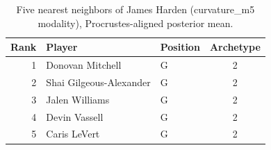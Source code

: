 \begin{table}[htbp]
  \centering\small
  \begin{tabular}{rllc}
    \toprule
    Rank & Player & Position & Archetype \\
    \midrule
    1 & Donovan Mitchell & G & 2 \\
    2 & Shai Gilgeous-Alexander & G & 2 \\
    3 & Jalen Williams & G & 2 \\
    4 & Devin Vassell & G & 2 \\
    5 & Caris LeVert & G & 2 \\
    \bottomrule
  \end{tabular}
  \caption{Five nearest neighbors of James Harden (curvature_m5 modality), Procrustes-aligned posterior mean.}
  \label{tab:James_Harden_neighbors_curvature_m5}
\end{table}


